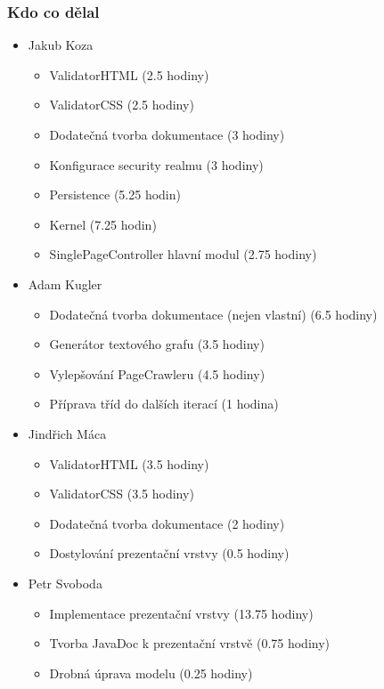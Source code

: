 \documentclass{beamer}
\begin{document}
\begin{frame}[allowframebreaks]\frametitle{Kdo co dělal} 
  \begin{itemize}
    \item Jakub Koza
      \begin{itemize}
       \item ValidatorHTML (2.5 hodiny)
			 \item ValidatorCSS (2.5 hodiny)
			 \item Dodatečná tvorba dokumentace (3 hodiny)
			 \item Konfigurace security realmu (3 hodiny)
			 \item Persistence (5.25 hodin)
			 \item Kernel (7.25 hodin)
			 \item SinglePageController hlavní modul (2.75 hodiny)
     \end{itemize}

    \item Adam Kugler
      \begin{itemize}
       \item Dodatečná tvorba dokumentace (nejen vlastní) (6.5 hodiny)
       \item Generátor textového grafu (3.5 hodiny)
       \item Vylepšování PageCrawleru (4.5 hodiny)
       \item Příprava tříd do dalších iterací (1 hodina)
     \end{itemize}

    \item Jindřich Máca
      \begin{itemize}
       \item ValidatorHTML (3.5 hodiny)
			 \item ValidatorCSS (3.5 hodiny)
			 \item Dodatečná tvorba dokumentace (2 hodiny)
			 \item Dostylování prezentační vrstvy (0.5 hodiny)
     \end{itemize}

    \item Petr Svoboda
      \begin{itemize}
       \item Implementace prezentační vrstvy (13.75 hodiny)
       \item Tvorba JavaDoc k prezentační vrstvě (0.75 hodiny)
       \item Drobná úprava modelu (0.25 hodiny)
     \end{itemize}
   \end{itemize}  
\end{frame} 
\end{document}
